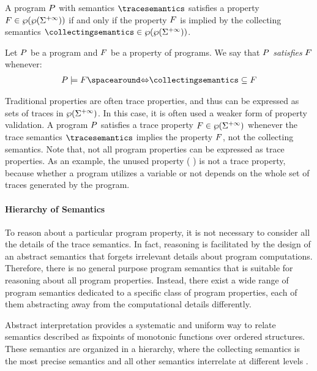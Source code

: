 A program $P$ with semantics $\tracesemantics$ satisfies a property $F \in \wp(\wp(\Sigma^{+\infty}))$ if and only if the property $F$ is implied by the collecting semantics $\collectingsemantics\in\collectingtype$.


\begin{definition}
  Let $P$ be a program and $F$ be a property of programs. We say that $P$ \emph{satisfies} $F$ whenever:
  \begin{align*}
    \defprogram \satisfies \defproperty \IfF \collectingsemantics \subseteq \defproperty
  \end{align*}
\end{definition}

Traditional properties are often trace properties, and thus can be expressed as sets of traces in $\wp(\Sigma^{+\infty})$. In this case, it is often used a weaker form of property validation. A program $P$ satisfies a trace property $F\in\wp(\Sigma^{+\infty})$ whenever the trace semantics $\tracesemantics$ implies the property $F$, not the collecting semantics. Note that, not all program properties can be expressed as trace properties. As an example, the unused property  (\cf{} ) is not a trace property, because whether a program utilizes a variable or not depends on the whole set of traces generated by the program.


\paragraph{Hierarchy of Semantics}

To reason about a particular program property, it is not necessary to consider all the details of the trace semantics.
In fact, reasoning is facilitated by the design of an abstract semantics that forgets irrelevant details about program computations.
Therefore, there is no general purpose program semantics that is suitable for reasoning about all program properties.
Instead, there exist a wide range of program semantics dedicated to a specific class of program properties, each of them abstracting away from the computational details differently.

Abstract interpretation provides a systematic and uniform way to relate semantics described as fixpoints of monotonic functions over ordered structures.
These semantics are organized in a hierarchy, where the collecting semantics is the most precise semantics and all other semantics interrelate at different levels .



